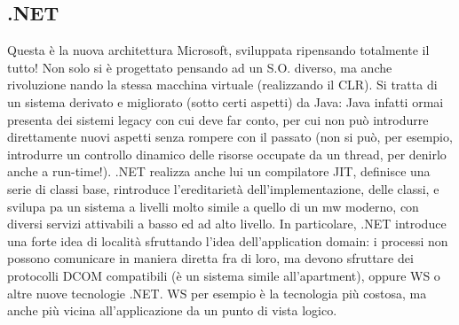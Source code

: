 \subsection{.NET}
Questa è la nuova architettura Microsoft, sviluppata ripensando totalmente il tutto! Non solo si è progettato pensando
ad un S.O. diverso, ma anche rivoluzione 
nando la stessa macchina virtuale (realizzando il CLR). Si tratta di un sistema
derivato e migliorato (sotto certi aspetti) da Java: Java infatti ormai presenta
dei sistemi legacy con cui deve far conto, per cui non può introdurre direttamente
nuovi aspetti senza rompere con il passato (non si può, per esempio, introdurre
un controllo dinamico delle risorse occupate da un thread, per denirlo anche a
run-time!). .NET realizza anche lui un compilatore JIT, definisce una serie di
classi base, rintroduce l'ereditarietà dell'implementazione, delle classi, e svilupa
pa un sistema a livelli molto simile a quello di un mw moderno, con diversi
servizi attivabili a basso ed ad alto livello.
In particolare, .NET introduce una forte idea di località sfruttando l'idea
dell'application domain: i processi non possono comunicare in maniera diretta
fra di loro, ma devono sfruttare dei protocolli DCOM compatibili (è un sistema
simile all'apartment), oppure WS o altre nuove tecnologie .NET. WS per esempio è la tecnologia più costosa, ma anche più
vicina all'applicazione da un punto
di vista logico.
